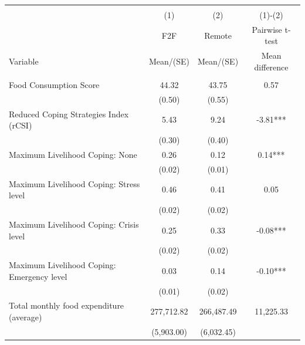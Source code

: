 
\begin{tabular}{@{\extracolsep{5pt}}lccc}
\\[-1.8ex]\hline \hline \\[-1.8ex]
 & \multicolumn{1}{c}{(1)}  & \multicolumn{1}{c}{(2)}  & \multicolumn{1}{c}{(1)-(2)} \\
 & \multicolumn{1}{c}{F2F}  & \multicolumn{1}{c}{Remote}  & \multicolumn{1}{c}{Pairwise t-test}  \\
Variable & Mean/(SE) & Mean/(SE) & Mean difference \\ \hline \\[-1.8ex] 
Food Consumption Score   & 44.32    & 43.75    & 0.57   \\
 & (0.50)  & (0.55)  &  \\ [1ex]
Reduced Coping Strategies Index (rCSI)   & 5.43    & 9.24    & -3.81***   \\
 & (0.30)  & (0.40)  &  \\ [1ex]
Maximum Livelihood Coping: None   & 0.26    & 0.12    & 0.14***   \\
 & (0.02)  & (0.01)  &  \\ [1ex]
Maximum Livelihood Coping: Stress level   & 0.46    & 0.41    & 0.05   \\
 & (0.02)  & (0.02)  &  \\ [1ex]
Maximum Livelihood Coping: Crisis level   & 0.25    & 0.33    & -0.08***   \\
 & (0.02)  & (0.02)  &  \\ [1ex]
Maximum Livelihood Coping: Emergency level   & 0.03    & 0.14    & -0.10***   \\
 & (0.01)  & (0.02)  &  \\ [1ex]
Total monthly food expenditure (average)   & 277,712.82    & 266,487.49    & 11,225.33   \\
 & (5,903.00)  & (6,032.45)  &  \\ [1ex]

\end{tabular}
